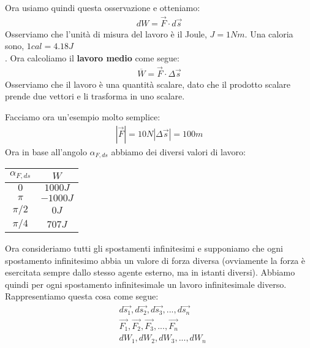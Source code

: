         Ora usiamo quindi questa osservazione e otteniamo:
        \begin{align*}
            dW=\vec{F}\cdot d\vec{s}
        \end{align*}
        Osserviamo che l'unità di misura del lavoro è il Joule, $J = 1 Nm$. Una caloria sono, $1cal=4.18J$\\.
        Ora calcoliamo il \textbf{lavoro medio} come segue:
        \begin{align*}
            \overline{W}=\vec{F}\cdot\Delta\vec{s}
        \end{align*}
        Osserviamo che il lavoro è una quantità scalare, dato che il prodotto scalare prende due vettori e li trasforma in uno scalare.
        \begin{mdframed}
            Facciamo ora un'esempio molto semplice:
            \begin{align*}
                |\vec{F}| = 10N
                |\Delta\vec{s}| = 100m
            \end{align*}
            Ora in base all'angolo $\alpha_{F,ds}$ abbiamo dei diversi valori di lavoro:
            \begin{center}
                \begin{tabular}{ |c|c| }
                    \hline
                    $\alpha_{F,ds}$ & $W$ \\
                    \hline
                    $0$ & $1000J$ \\
                    \hline
                    $\pi$ & $-1000J$ \\
                    \hline
                    $\pi/2$ & $0J$ \\
                    \hline
                    $\pi/4$ & $707J$ \\
                    \hline
                \end{tabular}
            \end{center}
        \end{mdframed}
        Ora consideriamo tutti gli spostamenti infinitesimi e supponiamo che ogni spostamento infinitesimo abbia un valore di forza diversa (ovviamente la forza è esercitata sempre dallo stesso agente esterno, ma in istanti diversi). Abbiamo quindi per ogni spostamento infinitesimale un lavoro infinitesimale diverso. Rappresentiamo questa cosa come segue:
        \begin{align*}
            &d\vec{s_1},d\vec{s_2},d\vec{s_3},...,d\vec{s_n}\\
            &\vec{F_1},\vec{F_2},\vec{F_3},...,\vec{F_n}\\
            &dW_1,dW_2,dW_3,...,dW_n
        \end{align*}
